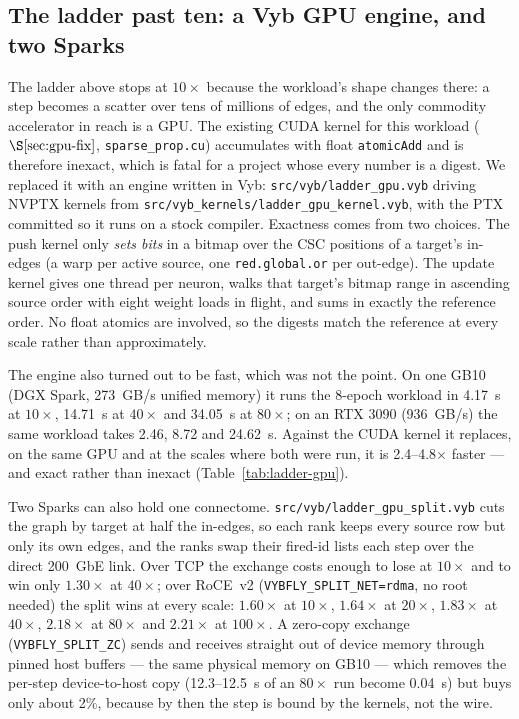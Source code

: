 \documentclass[11pt,a4paper]{article}
\newcommand{\code}[1]{\texttt{\footnotesize #1}}
\begin{document}
\subsection{The ladder past ten: a Vyb GPU engine, and two Sparks}
\label{sec:ladder-gpu}
The ladder above stops at $10\times$ because the workload's shape changes there: a step becomes a
scatter over tens of millions of edges, and the only commodity accelerator in reach is a GPU. The
existing CUDA kernel for this workload ($\S\ref{sec:gpu-fix}$, \code{sparse\_prop.cu}) accumulates
with float \code{atomicAdd} and is therefore inexact, which is fatal for a project whose every
number is a digest. We replaced it with an engine written in Vyb: \code{src/vyb/ladder\_gpu.vyb}
driving NVPTX kernels from \code{src/vyb\_kernels/ladder\_gpu\_kernel.vyb}, with the PTX committed so
it runs on a stock compiler. Exactness comes from two choices. The push kernel only \emph{sets bits}
in a bitmap over the CSC positions of a target's in-edges (a warp per active source, one
\code{red.global.or} per out-edge). The update kernel gives one thread per neuron, walks that
target's bitmap range in ascending source order with eight weight loads in flight, and sums in
exactly the reference order. No float atomics are involved, so the digests match the reference at
every scale rather than approximately.

The engine also turned out to be fast, which was not the point. On one GB10 (DGX Spark, 273~GB/s
unified memory) it runs the 8-epoch workload in 4.17~s at $10\times$, 14.71~s at $40\times$ and
34.05~s at $80\times$; on an RTX 3090 (936~GB/s) the same workload takes 2.46, 8.72 and 24.62~s.
Against the CUDA kernel it replaces, on the same GPU and at the scales where both were run, it is
2.4--4.8$\times$ faster --- and exact rather than inexact (Table~\ref{tab:ladder-gpu}).

Two Sparks can also hold one connectome. \code{src/vyb/ladder\_gpu\_split.vyb} cuts the graph by
target at half the in-edges, so each rank keeps every source row but only its own edges, and the
ranks swap their fired-id lists each step over the direct 200~GbE link. Over TCP the exchange costs
enough to lose at $10\times$ and to win only $1.30\times$ at $40\times$; over RoCE~v2
(\code{VYBFLY\_SPLIT\_NET=rdma}, no root needed) the split wins at every scale:
$1.60\times$ at $10\times$, $1.64\times$ at $20\times$, $1.83\times$ at $40\times$,
$2.18\times$ at $80\times$ and $2.21\times$ at $100\times$. A zero-copy exchange
(\code{VYBFLY\_SPLIT\_ZC}) sends and receives straight out of device memory through pinned host
buffers --- the same physical memory on GB10 --- which removes the per-step device-to-host copy
(12.3--12.5~s of an $80\times$ run become 0.04~s) but buys only about 2\%, because by then the step
is bound by the kernels, not the wire.
\end{document}

